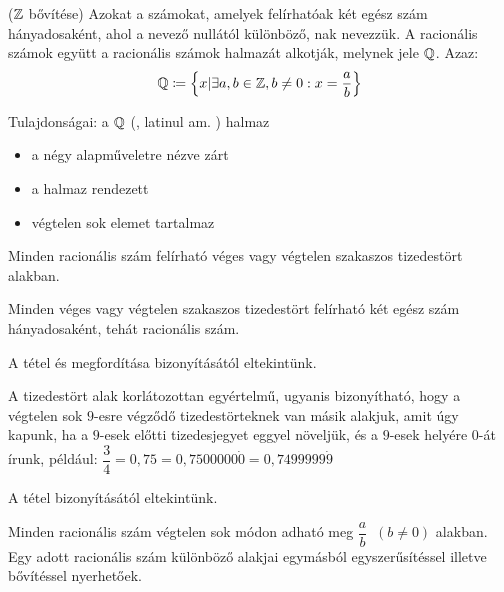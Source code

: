 \begin{defin} ($\mathbb{Z}$ bővítése)
Azokat a számokat, amelyek felírhatóak két egész szám hányadosaként, ahol a
nevező nullától különböző, nak nevezzük. A
racionális számok együtt a racionális számok halmazát alkotják, melynek jele 
$\mathbb{Q}$. Azaz:
\[
  \mathbb{Q} \coloneqq \Big\{x |\exists a, b \in \mathbb{Z}, b \neq 0:
  x = \dfrac{a}{b}\Big\}
\]

Tulajdonságai: a $\mathbb{Q}$ (, latinul am.
) halmaz
\begin{itemize}
\item a négy alapműveletre nézve zárt
\item a halmaz rendezett
\item végtelen sok elemet tartalmaz
\end{itemize}
\end{defin}

\begin{theorem2}
\label{theorem:racfrac}
Minden racionális szám felírható véges vagy végtelen szakaszos tizedestört
alakban.
\end{theorem2}

\begin{theoremconv2}
\label{theorem:racfracconv}
Minden véges vagy végtelen szakaszos tizedestört felírható két egész szám
hányadosaként, tehát racionális szám.
\end{theoremconv2}

\begin{proof5}
A tétel és megfordítása bizonyításától eltekintünk.
\end{proof5}

\begin{theorem4}
A tizedestört alak korlátozottan egyértelmű, ugyanis bizonyítható, hogy a
végtelen sok $9$-esre végződő tizedestörteknek van másik alakjuk, amit úgy
kapunk, ha a $9$-esek előtti tizedesjegyet eggyel növeljük, és a $9$-esek
helyére $0$-át írunk, például:
$\dfrac{3}{4} = 0,75 = 0,7500000\dot{0} = 0,7499999\dot{9}$
\end{theorem4}

\begin{proof5}
A tétel bizonyításától eltekintünk.
\end{proof5}

\begin{note}
Minden racionális szám végtelen sok módon adható meg
$\dfrac{a}{b}\;\;(b \neq 0)$ alakban. Egy adott racionális szám különböző
alakjai egymásból egyszerűsítéssel illetve bővítéssel nyerhetőek.
\end{note}

